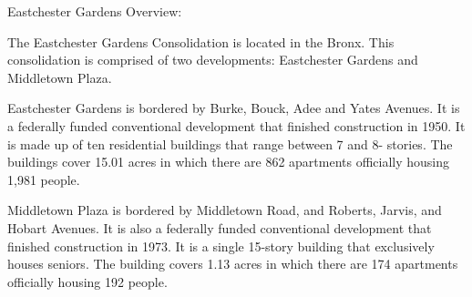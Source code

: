 Eastchester Gardens Overview:



The Eastchester Gardens Consolidation is located in the Bronx. This consolidation is comprised of two developments: Eastchester Gardens and Middletown Plaza.



Eastchester Gardens is bordered by Burke, Bouck, Adee and Yates Avenues.  It is a federally funded conventional development that finished construction in 1950. It is made up of ten residential buildings that range between 7 and 8- stories. The buildings cover 15.01 acres in which there are 862 apartments officially housing 1,981 people.   

  

Middletown Plaza is bordered by Middletown Road, and Roberts, Jarvis, and Hobart Avenues. It is also a federally funded conventional development that finished construction in 1973. It is a single 15-story building that exclusively houses seniors. The building covers 1.13 acres in which there are 174 apartments officially housing 192 people.
